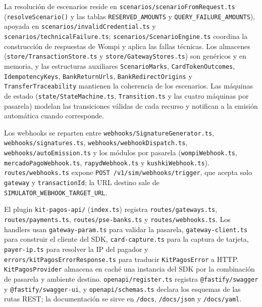 La resolución de escenarios reside en \texttt{scenarios/scenarioFromRequest.ts} (\texttt{resolveScenario()} y las tablas \texttt{RESERVED\_AMOUNTS} y \texttt{QUERY\_FAILURE\_AMOUNTS}), apoyada en \texttt{scenarios/invalidCredential.ts} y \texttt{scenarios/technicalFailure.ts}; \texttt{scenarios/ScenarioEngine.ts} coordina la construcción de respuestas de Wompi y aplica las fallas técnicas. Los almacenes (\texttt{store/TransactionStore.ts} y \texttt{store/GatewayStores.ts}) son genéricos y en memoria, y las estructuras auxiliares \texttt{ScenarioMarks}, \texttt{CardTokenOutcomes}, \texttt{IdempotencyKeys}, \texttt{BankReturnUrls}, \texttt{BankRedirectOrigins} y \texttt{TransferTraceability} mantienen la coherencia de los escenarios. Las máquinas de estado (\texttt{state/StateMachine.ts}, \texttt{Transition.ts} y las cuatro máquinas por pasarela) modelan las transiciones válidas de cada recurso y notifican a la emisión automática cuando corresponde.

Los webhooks se reparten entre \texttt{webhooks/\allowbreak{}SignatureGenerator.ts}, \texttt{webhooks/\allowbreak{}signatures.ts}, \texttt{webhooks/\allowbreak{}webhookDispatch.ts}, \texttt{webhooks/\allowbreak{}autoEmission.ts} y los módulos por pasarela (\texttt{wompiWebhook.ts}, \texttt{mercadoPagoWebhook.ts}, \texttt{rapydWebhook.ts} y \texttt{kushkiWebhook.ts}). \texttt{routes/\allowbreak{}webhooks.ts} expone \texttt{POST /\allowbreak{}v1/\allowbreak{}sim/\allowbreak{}webhooks/\allowbreak{}trigger}, que acepta solo \texttt{gateway} y \texttt{transactionId}; la URL destino sale de \texttt{SIMULATOR\_\allowbreak{}WEBHOOK\_\allowbreak{}TARGET\_\allowbreak{}URL}.

El plugin \texttt{kit-pagos-api/\allowbreak{}} (\texttt{index.ts}) registra \texttt{routes/\allowbreak{}gateways.ts}, \texttt{routes/\allowbreak{}payments.ts}, \texttt{routes/\allowbreak{}pse-banks.ts} y \texttt{routes/\allowbreak{}webhooks.ts}. Los handlers usan \texttt{gateway-param.ts} para validar la pasarela, \texttt{gateway-client.ts} para construir el cliente del SDK, \texttt{card-capture.ts} para la captura de tarjeta, \texttt{payer-ip.ts} para resolver la IP del pagador y \texttt{errors/\allowbreak{}kitPagosErrorResponse.ts} para traducir \texttt{KitPagosError} a HTTP. \texttt{KitPagosProvider} almacena en caché una instancia del SDK por la combinación de pasarela y ambiente destino. \texttt{openapi/\allowbreak{}register.ts} registra \texttt{@fastify/\allowbreak{}swagger} y \texttt{@fastify/\allowbreak{}swagger-ui}, y \texttt{openapi/\allowbreak{}schemas.ts} declara los esquemas de las rutas REST; la documentación se sirve en \texttt{/\allowbreak{}docs}, \texttt{/\allowbreak{}docs/\allowbreak{}json} y \texttt{/\allowbreak{}docs/\allowbreak{}yaml}.


